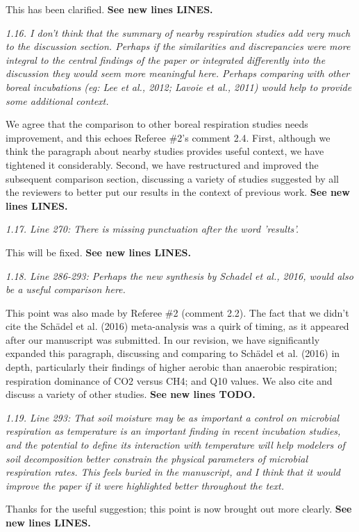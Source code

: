 \documentclass[11pt, oneside]{article}
\begin{document}
This has been clarified. {\bf See new lines LINES.}

\medskip
{\it 1.16. I don't think that the summary of nearby respiration studies add very much to the discussion section. Perhaps if the similarities and discrepancies were more integral to the central findings of the paper or integrated differently into the discussion they would seem more meaningful here. Perhaps comparing with other boreal incubations (eg: Lee et al., 2012; Lavoie et al., 2011) would help to provide some additional context. }

We agree that the comparison to other boreal respiration studies needs improvement, and this echoes Referee \#2's comment 2.4. First, although we think the paragraph about nearby studies provides useful context, we have tightened it considerably. Second, we have restructured and improved the subsequent comparison section, discussing a variety of studies suggested by all the reviewers to better put our results in the context of previous work. {\bf See new lines LINES.}

\medskip
{\it 1.17. Line 270: There is missing punctuation after the word 'results'. }

This will be fixed. {\bf See new lines LINES.}

\medskip
{\it 1.18. Line 286-293: Perhaps the new synthesis by Schadel et al., 2016, would also be a useful comparison here. }

This point was also made by Referee \#2 (comment 2.2). The fact that we didn't cite the Schädel et al. (2016) meta-analysis was a quirk of timing, as it appeared after our manuscript was submitted. In our revision, we have significantly expanded this paragraph, discussing and comparing to Schädel et al. (2016) in depth, particularly their findings of higher aerobic than anaerobic respiration; respiration dominance of CO2 versus CH4; and Q10 values. We also cite and discuss a variety of other studies. {\bf See new lines TODO.}

\medskip
{\it 1.19. Line 293: That soil moisture may be as important a control on microbial respiration as temperature is an important finding in recent incubation studies, and the potential to define its interaction with temperature will help modelers of soil decomposition better constrain the physical parameters of microbial respiration rates. This feels buried in the manuscript, and I think that it would improve the paper if it were highlighted better throughout the text. }

Thanks for the useful suggestion; this point is now brought out more clearly. {\bf See new lines LINES.}
\end{document}
